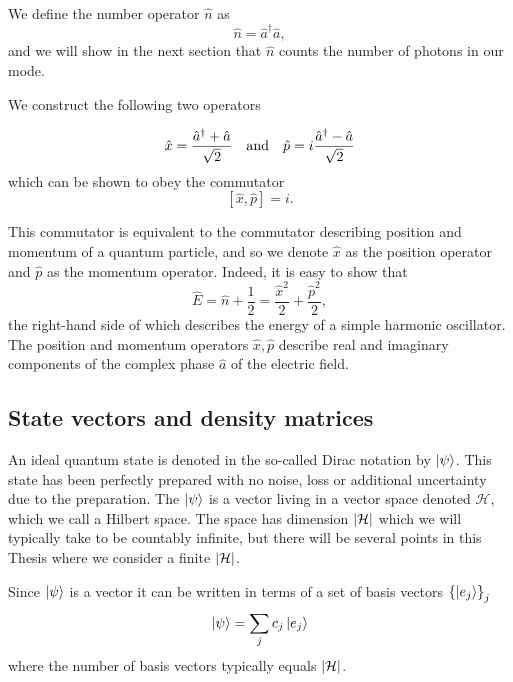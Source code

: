 We define the number operator $\hat{n}$ as 
\begin{equation}
\hat{n} = \hat{a}^\dagger \hat{a},
\end{equation}
and we will show in the next section that $\hat{n}$ counts the number of photons in our mode.

We construct the following two operators

\begin{equation}
\hat{x} = \frac{\hat{a}^\dagger + \hat{a}}{\sqrt{2}} \qq{and} \hat{p} = i \frac{\hat{a}^\dagger - \hat{a}}{\sqrt{2}}
\end{equation}
which can be shown to obey the commutator
\begin{equation}
\left[\hat{x}, \hat{p}\right] = i.
\end{equation}

\noindent This commutator is equivalent to the commutator describing position and momentum of a quantum particle, and so we denote $\hat{x}$ as the position operator and $\hat{p}$ as the momentum operator. Indeed, it is easy to show that
\begin{equation}
\hat{E} = \hat{n} + \frac{1}{2} = \frac{\hat{x}^2}{2} + \frac{\hat{p}^2}{2},
\end{equation}
the right-hand side of which describes the energy of a simple harmonic oscillator. The position and momentum operators $\hat{x}, \hat{p}$ describe real and imaginary components of the complex phase $\hat{a}$ of the electric field.


\subsection{State vectors and density matrices}
An ideal quantum state is denoted in the so-called Dirac notation by $\ket{\psi}$. This state has been perfectly prepared with no noise, loss or additional uncertainty due to the preparation. The $\ket{\psi}$ is a vector living in a vector space denoted $\mathcal{H}$, which we call a Hilbert space. The space has dimension $\left|\mathcal{H}\right|$ which we will typically take to be countably infinite, but there will be several points in this Thesis where we consider a finite $\left|\mathcal{H}\right|$.

Since $\ket{\psi}$ is a vector it can be written in terms of a set of basis vectors $\left\{\ket{e_j}\right\}_j$
\begin{equation}
\ket{\psi} = \sum_j c_j \ket{e_j}
\end{equation}
where the number of basis vectors typically equals $\left|\mathcal{H}\right|$. 

